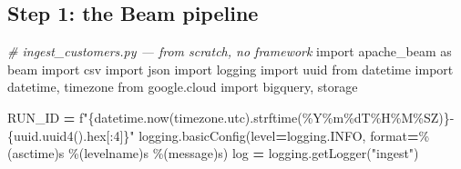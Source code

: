 \documentclass[
  11pt,
  british,
  oneside]{book}
\newenvironment{Shaded}{\begin{snugshade}}{\end{snugshade}}
\newcommand{\BuiltInTok}[1]{#1}
\newcommand{\CommentTok}[1]{\textcolor[rgb]{0.56,0.35,0.01}{\textit{#1}}}
\newcommand{\DecValTok}[1]{\textcolor[rgb]{0.00,0.00,0.81}{#1}}
\newcommand{\ImportTok}[1]{#1}
\newcommand{\NormalTok}[1]{#1}
\newcommand{\OperatorTok}[1]{\textcolor[rgb]{0.81,0.36,0.00}{\textbf{#1}}}
\newcommand{\SpecialCharTok}[1]{\textcolor[rgb]{0.00,0.00,0.00}{#1}}
\newcommand{\SpecialStringTok}[1]{\textcolor[rgb]{0.31,0.60,0.02}{#1}}
\newcommand{\StringTok}[1]{\textcolor[rgb]{0.31,0.60,0.02}{#1}}
\begin{document}
\hypertarget{step-1-the-beam-pipeline}{%
\subsection{Step 1: the Beam pipeline}\label{step-1-the-beam-pipeline}}

\begin{Shaded}
\begin{Highlighting}[]
\CommentTok{\# ingest\_customers.py  — from scratch, no framework}
\ImportTok{import}\NormalTok{ apache\_beam }\ImportTok{as}\NormalTok{ beam}
\ImportTok{import}\NormalTok{ csv}
\ImportTok{import}\NormalTok{ json}
\ImportTok{import}\NormalTok{ logging}
\ImportTok{import}\NormalTok{ uuid}
\ImportTok{from}\NormalTok{ datetime }\ImportTok{import}\NormalTok{ datetime, timezone}
\ImportTok{from}\NormalTok{ google.cloud }\ImportTok{import}\NormalTok{ bigquery, storage}

\NormalTok{RUN\_ID }\OperatorTok{=} \SpecialStringTok{f"}\SpecialCharTok{\{}\NormalTok{datetime}\SpecialCharTok{.}\NormalTok{now(timezone.utc)}\SpecialCharTok{.}\NormalTok{strftime(}\StringTok{\textquotesingle{}\%Y\%m}\SpecialCharTok{\%d}\StringTok{T\%H\%M\%SZ\textquotesingle{}}\NormalTok{)}\SpecialCharTok{\}}\SpecialStringTok{{-}}\SpecialCharTok{\{}\NormalTok{uuid}\SpecialCharTok{.}\NormalTok{uuid4()}\SpecialCharTok{.}\BuiltInTok{hex}\NormalTok{[:}\DecValTok{4}\NormalTok{]}\SpecialCharTok{\}}\SpecialStringTok{"}
\NormalTok{logging.basicConfig(level}\OperatorTok{=}\NormalTok{logging.INFO, }\BuiltInTok{format}\OperatorTok{=}\StringTok{\textquotesingle{}}\SpecialCharTok{\%(asctime)s}\StringTok{ }\SpecialCharTok{\%(levelname)s}\StringTok{ }\SpecialCharTok{\%(message)s}\StringTok{\textquotesingle{}}\NormalTok{)}
\NormalTok{log }\OperatorTok{=}\NormalTok{ logging.getLogger(}\StringTok{"ingest"}\NormalTok{)}


\end{Highlighting}
\end{Shaded}
\end{document}
